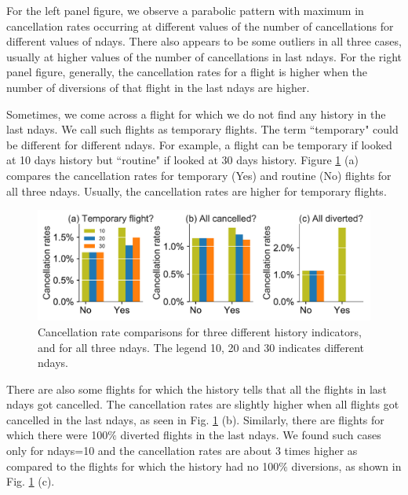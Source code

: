 \documentclass[12pt]{article}
\begin{document}
For the left panel figure, we observe a parabolic pattern with maximum in cancellation rates occurring at different values of the number of cancellations for different values of ndays. There also appears to be some outliers in all three cases, usually at higher values of the number of cancellations in last ndays.
For the right panel figure, generally, the cancellation rates for a flight is higher when the number of diversions of that flight in the last ndays are higher.


Sometimes, we come across a flight for which we do not find any history in the last ndays. We call such flights as temporary flights. The term ``temporary" could be different for different ndays. For example, a flight can be temporary if looked at 10 days history but ``routine" if looked at 30 days history. Figure \ref{fig:historyindicatorcanrate} (a) compares the cancellation rates for temporary (Yes) and routine (No) flights  for all three ndays. Usually, the cancellation rates are higher for temporary flights.  
\begin{figure}[h!]
\begin{center}
\includegraphics[width=6in]{history_indicator_canrate.pdf}
\end{center}
\caption{\label{fig:historyindicatorcanrate}
Cancellation rate comparisons for three different history indicators, and for all three ndays. The legend 10, 20 and 30 indicates different ndays.}
\end{figure}
There are also some flights for which the history tells that all the flights in last ndays got cancelled. The cancellation rates are slightly higher when all flights got cancelled in the last ndays, as seen in Fig. \ref{fig:historyindicatorcanrate} (b). Similarly, there are flights for which there were 100$\%$ diverted flights in the last ndays. We found such cases only for ndays=10 and the cancellation rates are about 3 times higher as compared to the flights for which the history had no 100$\%$ diversions, as shown in Fig. \ref{fig:historyindicatorcanrate} (c).
\end{document}
